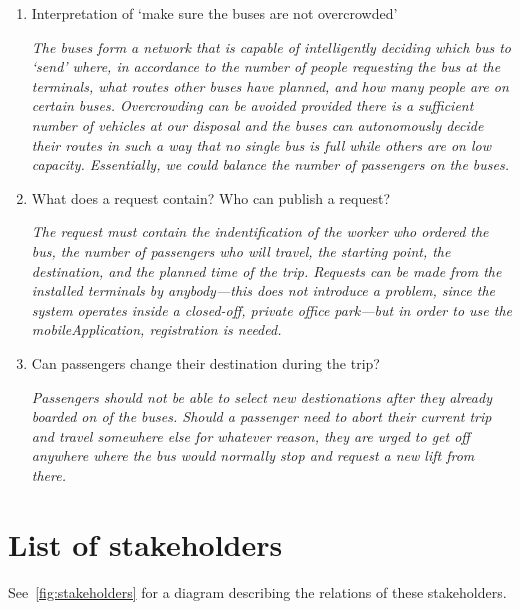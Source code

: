 \documentclass[a4paper]{article}
\begin{document}
\begin{enumerate}
	\item Interpretation of ‘make sure the buses are not overcrowded’

		\textit{The buses form a network that is capable of
			intelligently deciding which bus to ‘send’ where, in
			accordance to the number of people \gls{request}ing the
			bus at the \gls{terminal}s, what \gls{route}s other
			buses have planned, and how many people are on certain
			buses. Overcrowding can be avoided provided there is a
			sufficient number of \gls{vehicle}s at our disposal and
			the buses can \gls{autonomous}ly decide their
			\gls{route}s in such a way that no single bus is full
			while others are on low capacity. Essentially, we could
			balance the number of passengers on the buses.}

	\item What does a \gls{request} contain? Who can publish a
	      \gls{request}?

		\textit{The \gls{request} must contain the indentification of
			the worker who ordered the bus, the number of passengers
			who will travel, the starting point, the destination,
			and the planned time of the trip. Requests can be made
			from the installed terminals by anybody—this does not
			introduce a problem, since the system operates inside a
			closed-off, private office park—but in order to use
			the \gls{mobileApplication}, registration is needed.}

	\item Can passengers change their destination during the trip?

		\textit{Passengers should not be able to select new
			destionations after they already boarded on of the
			buses. Should a passenger need to abort their current
			trip and travel somewhere else for whatever reason, they
			are urged to get off anywhere where the bus would
			normally stop and \gls{request} a new lift from there.}
\end{enumerate}


\section{List of stakeholders}

See~\cref{fig:stakeholders} for a diagram describing the relations of these
\gls{stakeholder}s.
\end{document}
